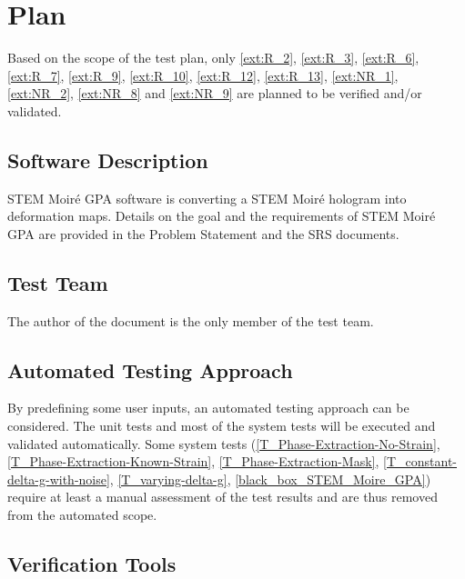 \documentclass[12pt, titlepage]{article}
\newcommand{\progname}{STEM Moir{\'e} GPA}
\begin{document}

\section{Plan}

Based on the scope of the test plan, only \cref{ext:R_2}, \cref{ext:R_3}, \cref{ext:R_6}, \cref{ext:R_7}, \cref{ext:R_9}, \cref{ext:R_10}, \cref{ext:R_12}, \cref{ext:R_13}, \cref{ext:NR_1}, \cref{ext:NR_2}, \cref{ext:NR_8} and \cref{ext:NR_9} are planned to be verified and/or validated. 

	
\subsection{Software Description}

\progname{} software is converting a STEM Moir{\'e} hologram into deformation maps. Details on the goal and the requirements of \progname{} are provided in the Problem Statement and the SRS documents.

\subsection{Test Team}

The author of the document is the only member of the test team.

\subsection{Automated Testing Approach}

By predefining some user inputs, an automated testing approach can be considered. The unit tests and most of the system tests will be executed and validated automatically. Some system tests (\cref{T_Phase-Extraction-No-Strain}, \cref{T_Phase-Extraction-Known-Strain}, \cref{T_Phase-Extraction-Mask}, \cref{T_constant-delta-g-with-noise}, \cref{T_varying-delta-g}, \cref{black_box_STEM_Moire_GPA}) require at least a manual assessment of the test results and are thus removed from the automated scope.

\subsection{Verification Tools}
\end{document}
